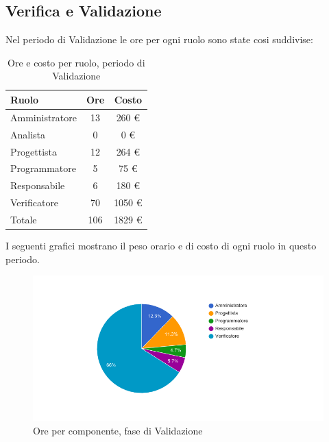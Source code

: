 \subsection{Verifica e Validazione}
Nel periodo di Validazione le ore per ogni ruolo sono state cosi suddivise:

\begin{table}[H]
	\centering
	\begin{tabular}{ l c c }
		\textbf{Ruolo} & \textbf{Ore} & \textbf{Costo} \\
		\hline
		Amministratore & 13 & 260 \euro{} \\
		Analista & 0 & 0 \euro{} \\
		Progettista & 12 & 264 \euro{} \\
		Programmatore & 5 & 75 \euro{} \\
		Responsabile & 6 & 180 \euro{} \\
		Verificatore & 70 & 1050 \euro{} \\
		\hline
		Totale & 106 & 1829 \euro{} \\
		\hline
	\end{tabular}
	\caption{Ore e costo per ruolo, periodo di Validazione}
\end{table}

I seguenti grafici mostrano il peso orario e di costo di ogni ruolo in questo periodo.

\begin{figure}[H]
  \begin{center}
    \includegraphics[width=15cm]{res/img/prospettoEconomico/orePerRuoloValidazione.png}
  \caption{Ore per componente, fase di Validazione}
  \end{center} 
\end{figure}  

